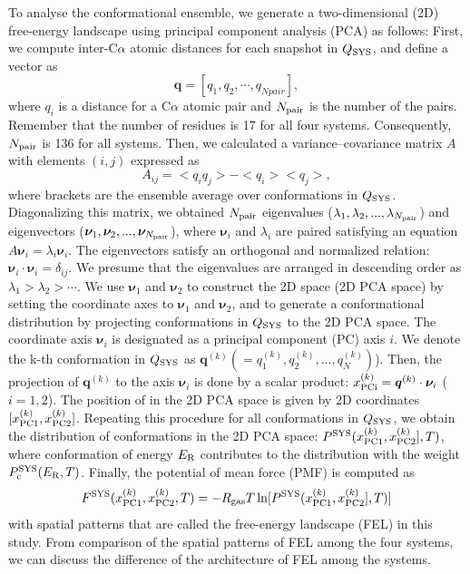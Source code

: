 To analyse the conformational ensemble, we generate a two-dimensional (2D) free-energy landscape using principal component analysis (PCA) as follows: First, we compute inter-C$\alpha$ atomic distances for each snapshot in $Q_{\rm SYS}$, and define a vector as 
\begin{equation}
\bm{q}=[q_1, q_2,\cdots,q_{Npair}],
\end{equation} 
where $q_i$ is a distance for a C$\alpha$ atomic pair and $N_{\rm pair}$ is the number of the pairs. Remember that the number of residues is 17 for all four systems. Consequently, $N_{\rm pair}$ is 136 for all systems. Then, we calculated a variance–covariance matrix $A$ with elements $(i,j)$ expressed as
\begin{equation}
A_{ij}=<q_i q_j > - <q_i > < q_j >,
\end{equation} 
where brackets are the ensemble average over conformations in $Q_{\rm SYS}$. Diagonalizing this matrix, we obtained $N_{\rm pair}$ eigenvalues ($\lambda_1, \lambda_2,...,\lambda_{N_{\rm pair}}$) and eigenvectors ($\bm{\nu}_1, \bm{\nu}_2,...,\bm{\nu}_{N_{\rm pair}}$), where $\bm{\nu}_i$ and $\lambda_i$ are paired satisfying an equation $A\bm{\nu}_i=\lambda_i \bm{\nu}_i$. The eigenvectors satisfy an orthogonal and normalized relation: $\bm{\nu}_i \cdot \bm{\nu}_i = \delta_{ij}$. We presume that the eigenvalues are arranged in descending order as $\lambda_1 > \lambda_2> \cdots$.
We use $\bm{\nu}_1$ and $\bm{\nu}_2$ to construct the 2D space (2D PCA space) by setting the coordinate axes to $\bm{\nu}_1$ and $\bm{\nu}_2$, and to generate a conformational distribution by projecting conformations in $Q_{\rm SYS}$ to the 2D PCA space. The coordinate axis $\bm{\nu}_i$ is designated as a principal component (PC) axis $i$. We denote the k-th conformation in $Q_{\rm SYS}$ as  $\bm{q}^{(k)}(=q_1^{(k)}, q_2^{(k)},..., q_N^{(k)})$). Then, the projection of $\bm{q}^{(k)}$ to the axis $\bm{\nu}_i$ is done by a scalar product: $x^{(k)}_{\rm PCi}=\bm{q}^{(k)} \cdot \bm{\nu}_i$ ($i=1,2$). The position of  in the 2D PCA space is given by 2D coordinates $[x^{(k)}_{\rm PC1}, x^{(k)}_{\rm PC2}]$. Repeating this procedure for all conformations in $Q_{\rm SYS}$, we obtain the distribution of conformations in the 2D PCA space: $P^{\rm SYS}(x^{(k)}_{\rm PC1}, x^{(k)}_{\rm PC2}],T)$, where conformation of energy $E_{\rm R}$ contributes to the distribution with the weight $P_{\rm c}^{\rm SYS}(E_{\rm R},T)$. Finally, the potential of mean force (PMF) is computed as 
\begin{equation}
F^{\rm SYS}(x^{(k)}_{\rm PC1}, x^{(k)}_{\rm PC2},T)=-R_{\rm gas}T\ln[P^{\rm SYS}(x^{(k)}_{\rm PC1}, x^{(k)}_{\rm PC2}],T)]
\end{equation}
with spatial patterns that are called the free-energy landscape (FEL) in this study. From comparison of the spatial patterns of FEL among the four systems, we can discuss the difference of the architecture of FEL among the systems.

